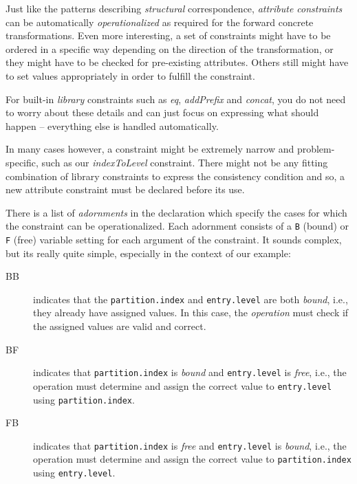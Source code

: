 Just like the patterns describing \emph{structural} correspondence,  \emph{attribute constraints} can be automatically \emph{operationalized} as required for
the forward concrete transformations. Even more interesting, a set of constraints might have to be ordered in a specific way depending on
the direction of the transformation, or they might have to be checked for pre-existing attributes. Others still might have to set values appropriately in
order to fulfill the constraint.

For built-in \emph{library} constraints such as \emph{eq}, \emph{addPrefix} and \emph{concat}, you do not need to worry about these details and can just focus
on expressing what should happen -- everything else is handled automatically.

In many cases however, a constraint might be extremely narrow and problem-specific, such as our \emph{indexToLevel} constraint. There might not be any
fitting combination of library constraints to express the consistency condition and so, a new attribute constraint must be declared before its use.

There is a list of \emph{adornments} in the declaration which specify the cases for which the constraint can be operationalized. Each adornment consists of a
\texttt{B} (bound) or \texttt{F} (free) variable setting for each argument of the constraint. It sounds complex, but its really quite simple, especially in
the context of our example:

\begin{description}

\item[BB] indicates that the \texttt{partition.index} and \texttt{entry.level} are both \emph{bound}, i.e., they already have assigned values.
In this case, the \emph{operation} must check if the assigned values are valid and correct.

\item[BF] indicates that \texttt{partition.index} is \emph{bound} and \texttt{entry.level} is \emph{free}, i.e., the operation must determine and assign the
correct value to \texttt{entry.level} using \texttt{partition.index}.

\item[FB] indicates that \texttt{partition.index} is \emph{free} and \texttt{entry.level} is \emph{bound}, i.e., the operation must determine and assign the
correct value to \texttt{parti\-tion.in\-dex} using \texttt{entry.level}.

\end{description}

